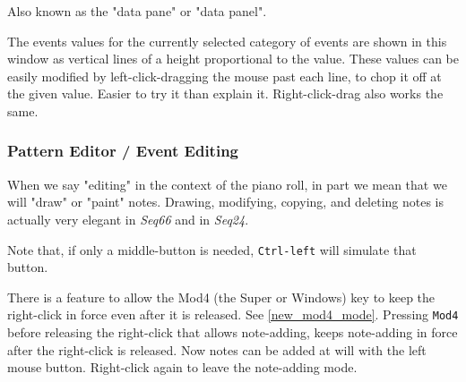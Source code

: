    Also known as the "data pane"
   or "data panel".

   The events values for the currently selected category of events are shown
   in this window as vertical lines of a height proportional to the value.
   These values can be easily modified by
   left-click-dragging the
   mouse past each line, to chop it off at the given value.  Easier to try
   it than explain it.
   Right-click-drag also works the same.

\subsubsection{Pattern Editor / Event Editing}
\label{subsubsec:pattern_editor_event_editing}

   When we say "editing" in the context of the piano roll, in part we mean that
   we will "draw"
   or "paint"
    notes.
   Drawing, modifying, copying, and deleting
   notes is actually very elegant in \textsl{Seq66} and in
   \textsl{Seq24}.


   Note that, if only a middle-button is needed,
   \texttt{Ctrl-left} will simulate that button.


   There is a feature to allow the Mod4
   (the Super or Windows) key to keep the
   right-click in force even after it is released.  See \ref{new_mod4_mode}.
   Pressing \texttt{Mod4} before releasing the right-click that allows
   note-adding, keeps note-adding in force after the right-click is released.
   Now notes can be added at will with the left mouse button.
   Right-click again to leave the note-adding mode.

